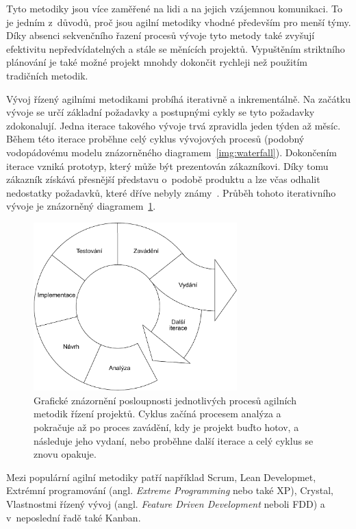 Tyto metodiky jsou více zaměřené na lidi a na jejich vzájemnou komunikaci. To je jedním z~důvodů, proč jsou agilní metodiky vhodné především pro menší týmy. Díky absenci sekvenčního řazení procesů vývoje tyto metody také zvyšují efektivitu nepředvídatelných a stále se měnících projektů. Vypuštěním striktního plánování je také možné projekt mnohdy dokončit rychleji než použitím tradičních metodik.

Vývoj řízený agilními metodikami probíhá iterativně a inkrementálně. Na začátku vývoje se určí základní požadavky a postupnými cykly se tyto požadavky zdokonalují. Jedna iterace takového vývoje trvá zpravidla jeden týden až měsíc. Během této iterace proběhne celý cyklus vývojových procesů (podobný vodopádovému modelu znázorněného diagramem~\ref{img:waterfall}). Dokončením iterace vzniká prototyp, který může být prezentován zákazníkovi. Díky tomu zákazník získává přesnější představu o~podobě produktu a lze včas odhalit nedostatky požadavků, které dříve nebyly známy~\cite{bib:agile-impact}. 
Průběh tohoto iterativního vývoje je znázorněný diagramem~\ref{img:agile}.

\begin{figure}[H]
	\centering
	\includegraphics[width=0.7\textwidth]{obrazky-figures/agile.pdf}
	\caption{Grafické znázornění posloupnosti jednotlivých procesů agilních metodik řízení projektů. Cyklus začíná procesem analýza a pokračuje až po proces zavádění, kdy je projekt buďto hotov, a následuje jeho vydaní, nebo proběhne další iterace a celý cyklus se znovu opakuje.}
	\label{img:agile}
\end{figure}

Mezi populární agilní metodiky patří například Scrum, Lean Developmet, Extrémní programování (angl. \emph{Extreme Programming} nebo také XP), Crystal, Vlastnostmi řízený vývoj (angl. \emph{Feature Driven Development} neboli FDD) a v~neposlední řadě také Kanban.

